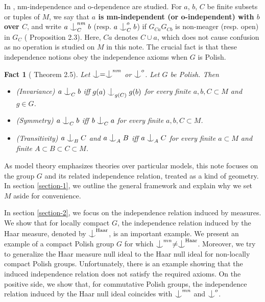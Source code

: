\documentclass{article}
\newtheorem{fact}[definition]{Fact}
\newcommand{\HH}{\mathrm{Haar}}
\newcommand{\ind}{\mathrel{\raise0.2ex\hbox{\ooalign{\hidewidth$\vert$\hidewidth\cr\raise-0.9ex\hbox{$\smile$}}}}}
\begin{document}
In \cite{KP}, nm-independence and o-dependence are studied.  For $a$, $b$, $C$ be finite subsets or tuples of $M$, we say that \textbf{$a$ is mn-independent (or o-independent) with $b$ over $C$}, and write $a\ind_C^{nm}b$ (resp. $a\ind_C^o b$) if $G_{Ca} G_{Cb}$ is non-meager (resp. open) in $G_C$ (\cite{KP} Proposition 2.3). Here, $Ca$ denotes $C\cup a$, which does not cause confusion as no operation is studied on $M$ in this note. 
The crucial fact is that these independence notions obey the independence axioms when $G$ is Polish.

\begin{fact}[\cite{KP} Theorem 2.5]\label{Axioms}
Let $\ind=\ind^{nm}$ or $\ind^o$. Let $G$ be Polish. Then 
\begin{itemize}
\item (Invariance) $a\ind _C b$ iff $g(a) \ind_{g(C)} g(b)$ for every finite $a,b, C\subset M$ and $g\in G$.

\item (Symmetry) $a\ind_C b$ iff $b\ind_C a$ for every finite $a,b,C\subset M$.

\item (Transitivity) $a\ind_B C$ and $a\ind_A B$ iff $a\ind_A C$ for every finite $a\subset M$ and finite $A\subset B\subset C\subset M$.
\end{itemize}
\end{fact}



As model theory emphasizes theories over particular models, this note focuses on the group $G$ and its related independence relation, treated as a kind of geometry. 
In section \ref{section-1}, we outline the general framework and explain why we set 
$M$ aside for convenience. 

In section \ref{section-2}, we focus on the independence relation induced by measures. We  show that for locally compact $G$, the independence relation induced 
by the Haar measure, denoted by $\ind^\HH$, is an important example. We present an example of a compact Polish group $G$ for which $\ind^{mn}\neq \ind^\HH$. Moreover, we try to generalize the Haar measure null ideal to the Haar null ideal for non-locally compact Polish groups. Unfortunately, there is an example showing that the induced independence relation does not satisfy the required axioms. On the positive side, we show that, for commutative Polish groups, the independence relation induced by the Haar null ideal coincides with $\ind^{mn}$ and $\ind^o$.
\end{document}
